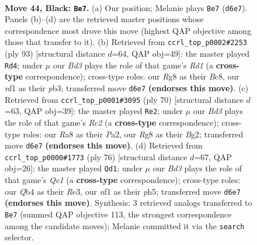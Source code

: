 \documentclass[11pt]{article}
\begin{document}
\clearpage

\begin{figure}[p]\centering
\begin{subfigure}{0.46\textwidth}\centering
\resizebox{\linewidth}{!}{%
\newchessgame
\chessboard[
  setfen={r5r1/p5pp/2kb4/3p2QP/pq1P2P1/4P2K/8/5N2 b - - 3 44},
  showmover=false,
  pgfstyle=straightmove, color=movearrow, markmove={d6-e7}
]}
\caption{}
\end{subfigure}\hfill
\begin{subfigure}{0.46\textwidth}\centering
\resizebox{\linewidth}{!}{%
\newchessgame
\chessboard[
  setfen={2br4/2p1qkp1/p1Q5/8/1p2P3/1P6/1PP2N2/1K5R b - - 4 47},
  showmover=false,
  pgfstyle=straightmove, color=movearrow, markmove={d8-d4}
]}
\caption{}
\end{subfigure}
\\[4pt]
\begin{subfigure}{0.46\textwidth}\centering
\resizebox{\linewidth}{!}{%
\newchessgame
\chessboard[
  setfen={4r1k1/5p2/3p4/p2P2p1/5q1p/5P2/P1R2QB1/6K1 w - - 0 36},
  showmover=false,
  pgfstyle=straightmove, color=movearrow, markmove={c2-e2}
]}
\caption{}
\end{subfigure}\hfill
\begin{subfigure}{0.46\textwidth}\centering
\resizebox{\linewidth}{!}{%
\newchessgame
\chessboard[
  setfen={4r3/p7/Ppp3k1/2p1q1pp/4P3/1P2R2P/2P3P1/4Q2K w - - 1 39},
  showmover=false,
  pgfstyle=straightmove, color=movearrow, markmove={e1-d1}
]}
\caption{}
\end{subfigure}
\caption{\textbf{Move 44, Black: \texttt{Be7}.} (a) Our position; Melanie plays \texttt{Be7} (\texttt{d6e7}). Panels (b)--(d) are the retrieved master positions whose correspondence most drove this move (highest QAP objective among those that transfer to it). (b) Retrieved from \texttt{ccrl\_top\_p0002\#2253} (ply 93) [structural distance $d$=64, QAP obj=49]: the master played \texttt{Rd4}; under $\mu$ our \emph{Bd3} plays the role of that game's \emph{Rd1} (a \textbf{cross-type} correspondence); cross-type roles: our \emph{R}g8 as their \emph{B}c8, our \emph{n}f1 as their \emph{p}b3; transferred move \texttt{d6e7} \textbf{(endorses this move)}. (c) Retrieved from \texttt{ccrl\_top\_p0001\#3095} (ply 70) [structural distance $d$=63, QAP obj=39]: the master played \texttt{Re2}; under $\mu$ our \emph{Bd3} plays the role of that game's \emph{Rc2} (a \textbf{cross-type} correspondence); cross-type roles: our \emph{R}a8 as their \emph{P}a2, our \emph{R}g8 as their \emph{B}g2; transferred move \texttt{d6e7} \textbf{(endorses this move)}. (d) Retrieved from \texttt{ccrl\_top\_p0000\#1773} (ply 76) [structural distance $d$=67, QAP obj=26]: the master played \texttt{Qd1}; under $\mu$ our \emph{Bd3} plays the role of that game's \emph{Qe1} (a \textbf{cross-type} correspondence); cross-type roles: our \emph{Q}b4 as their \emph{R}e3, our \emph{n}f1 as their \emph{p}h5; transferred move \texttt{d6e7} \textbf{(endorses this move)}. Synthesis: 3 retrieved analogs transferred to \texttt{Be7} (summed QAP objective 113, the strongest correspondence among the candidate moves); Melanie committed it via the \texttt{search} selector.}
\label{fig:thought-m87}
\end{figure}
\end{document}
